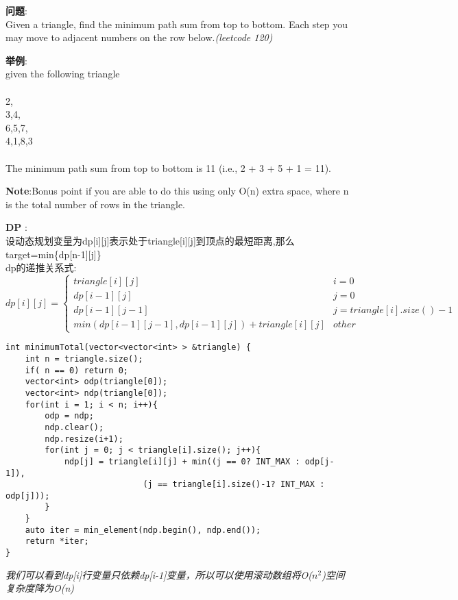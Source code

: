     
\begin{description}
    \item{\textbf{问题}}:\\
Given a triangle, find the minimum path sum from top to bottom. Each step you may move to adjacent numbers on the row below.\textit{(leetcode 120)}
    \item{\textbf{举例}}:\\
given the following triangle\\
\\
     2, \\
    3,4, \\
   6,5,7, \\
  4,1,8,3 \\
\\
The minimum path sum from top to bottom is 11 (i.e., 2 + 3 + 5 + 1 = 11). \\

    \item{\textbf{Note}}:Bonus point if you are able to do this using only O(n) extra space, where n is the total number of rows in the triangle.
    \item{\textbf{DP}} : 
    \\设动态规划变量为dp[i][j]表示处于triangle[i][j]到顶点的最短距离,那么target=min\{dp[n-1][j]\}
	\\dp的递推关系式:
$$
dp[i][j] =
\begin{cases} 
triangle[i][j] & i = 0  \\
dp[i-1][j] & j = 0  \\
dp[i-1][j-1] & j = triangle[i].size() - 1 \\
min(dp[i-1][j-1], dp[i-1][j]) + triangle[i][j] & other 
\end{cases}
$$
    \begin{lstlisting}
int minimumTotal(vector<vector<int> > &triangle) {
	int n = triangle.size();
	if( n == 0)	return 0;
	vector<int> odp(triangle[0]);
	vector<int> ndp(triangle[0]);
	for(int i = 1; i < n; i++){
		odp = ndp;
		ndp.clear();
		ndp.resize(i+1);
		for(int j = 0; j < triangle[i].size(); j++){
			ndp[j] = triangle[i][j] + min((j == 0? INT_MAX : odp[j-1]), 
							(j == triangle[i].size()-1? INT_MAX : odp[j]));
		}
	}
	auto iter = min_element(ndp.begin(), ndp.end());
	return *iter;
}
    \end{lstlisting}
	\textit{我们可以看到dp[i]行变量只依赖dp[i-1]变量，所以可以使用滚动数组将O($n^2$)空间复杂度降为O(n)}
\end{description}

